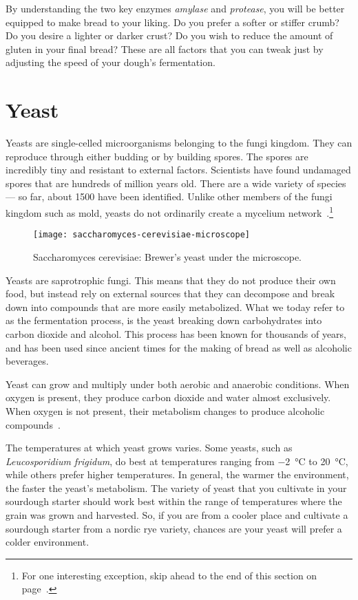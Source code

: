 By understanding the two key enzymes \emph{amylase} and \emph{protease}, you
will be better equipped to make bread to your liking. Do you prefer a softer
or stiffer crumb? Do you desire a lighter or darker crust? Do you wish to reduce
the amount of gluten in your final bread? These are all factors that you can
tweak just by adjusting the speed of your dough's fermentation.

\section{Yeast}

Yeasts are single-celled microorganisms belonging to the fungi kingdom. They
can reproduce through either budding or by building spores. The spores are
incredibly tiny and resistant to external factors. Scientists have found undamaged
spores that are hundreds of million years old. There are a wide variety of
species --- so far, about \num{1500}
have been identified. Unlike other members of the fungi kingdom such as mold,
yeasts do not ordinarily create a mycelium
network~\cite{molecular+mechanisms+yeast}.\footnote{For one interesting
exception, skip ahead to the end of this section on
page~\pageref{aggressive-yeast}.}

\begin{figure}[!htb]
\centering
  \texttt{[image: saccharomyces-cerevisiae-microscope]}
  \caption[Brewer's yeast]{Saccharomyces cerevisiae: Brewer's yeast under the
      microscope.}%
  \label{saccharomyces-cerevisiae-microscope}
\end{figure}

Yeasts are saprotrophic fungi. This means that they do not produce their own
food, but instead rely on external sources that they can decompose and break
down into compounds that are more easily metabolized. What we today
refer to as the fermentation process, is the yeast breaking down carbohydrates
into carbon dioxide and alcohol. This process has been known for thousands
of years, and has been used since ancient times for the making of bread as well
as alcoholic beverages.

Yeast can grow and multiply under both aerobic and anaerobic conditions. When
oxygen is present, they produce carbon dioxide and water almost exclusively.
When oxygen is not present, their metabolism changes to produce alcoholic
compounds~\cite{effects+oxygen+yeast+growth}.

The temperatures at which yeast grows varies. Some yeasts, such as
\emph{Leucosporidium frigidum}, do best at temperatures ranging from \qty{-2}{\degreeCelsius} to
 \qty{20}{\degreeCelsius}, while others prefer higher temperatures. In general, the warmer the
environment, the faster the yeast's metabolism. The variety of yeast
that you cultivate in your sourdough starter should work best within the range
of temperatures where the grain was grown and harvested. So, if you are from a
cooler place and cultivate a sourdough starter from a nordic rye variety,
chances are your yeast will prefer a colder environment.


